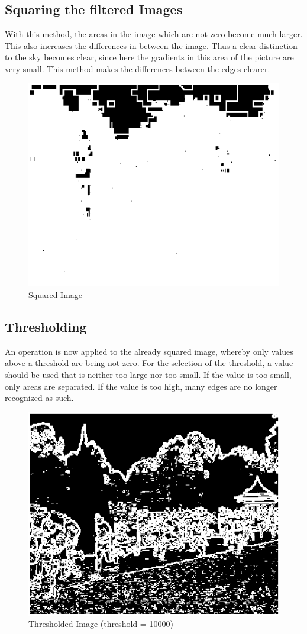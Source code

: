 \documentclass{article}
\begin{document}
	\subsection{Squaring the filtered Images}
	With this method, the areas in the image which are not zero become much larger. This also increases the differences in between the image.
	Thus a clear distinction to the sky becomes clear, since here the gradients in this area of the picture are very small. 
	This method makes the differences between the edges clearer.
	\begin{figure}[!h]
		\center
		\caption{Squared Image}
		\includegraphics{I2.png}
	\end{figure}
	\subsection{Thresholding}
	An operation is now applied to the already squared image, whereby only values above a threshold are being not zero. 
	For the selection of the threshold, a value should be used that is neither too large nor too small. 
	If the value is too small, only areas are separated. If the value is too high, many edges are no longer recognized as such.
	\begin{figure}[!h]
		\center
		\caption{Thresholded Image (threshold = 10000)}
		\includegraphics{Et.png}
	\end{figure}
\end{document}
